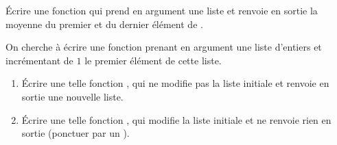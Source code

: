 \question{} \'Ecrire une fonction  qui prend en argument une liste  et renvoie en sortie la moyenne du premier et du dernier élément de .

\question{}On cherche à écrire une fonction prenant en argument une liste d'entiers et incrémentant de $1$ le premier élément de cette liste.
\begin{enumerate}[label=\emph{\alph*)}]
  \item \'Ecrire une telle fonction , qui ne modifie pas la liste initiale et renvoie en sortie une nouvelle liste.
  \item \'Ecrire une telle fonction , qui modifie la liste initiale et ne renvoie rien en sortie (ponctuer par un ).
\end{enumerate}
